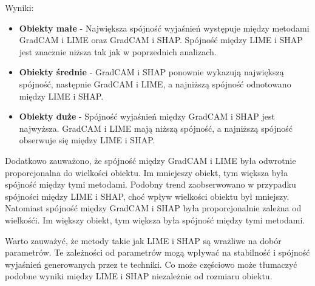 Wyniki:
\begin{itemize}
	\item \textbf{Obiekty małe} - Największa spójność wyjaśnień występuje między metodami GradCAM i LIME oraz GradCAM i SHAP.
	      Spójność między LIME i SHAP jest znacznie niższa tak jak w poprzednich analizach.
	\item \textbf{Obiekty średnie} - GradCAM i SHAP ponownie wykazują największą spójność, następnie GradCAM i LIME, a najniższą spójność odnotowano między LIME i SHAP.
	\item \textbf{Obiekty duże} - Spójność wyjaśnień między GradCAM i SHAP jest najwyższa. GradCAM i LIME mają niższą spójność, a najniższą spójność obserwuje się między LIME i SHAP.
\end{itemize}

Dodatkowo zauważono, że spójność między GradCAM i LIME była odwrotnie proporcjonalna do wielkości obiektu.
Im mniejeszy obiekt, tym większa była spójność między tymi metodami.
Podobny trend zaobserwowano w przypadku spójności między LIME i SHAP, choć wpływ wielkości obiektu był mniejszy.
Natomiast spójność między GradCAM i SHAP była proporcjonalnie zależna od wielkośći.
Im większy obiekt, tym większa była spójność między tymi metodami.

Warto zauważyć, że metody takie jak LIME i SHAP są wrażliwe na dobór parametrów.
Te zależności od parametrów mogą wpływać na stabilność i spójność wyjaśnień generowanych przez te techniki.
Co może częściowo może tłumaczyć podobne wyniki między LIME i SHAP niezależnie od rozmiaru obiektu.

